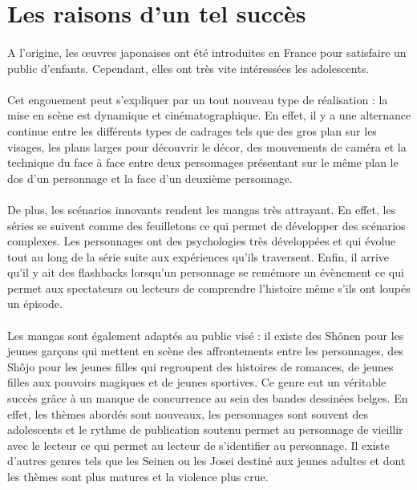 \section{Les raisons d'un tel succès}

\paragraph{} A l’origine, les œuvres japonaises ont été introduites en France
pour satisfaire un public d’enfants. Cependant, elles ont très vite intéressées
les adolescents. 

\paragraph{} Cet engouement peut s’expliquer par un tout nouveau type de
réalisation : la mise en scène est dynamique et cinématographique. En effet, il
y a une alternance continue entre les différents types de cadrages tels que des
gros plan sur les visages, les plans larges pour découvrir le décor, des
mouvements de caméra et la technique du face à face entre deux personnages
présentant sur le même plan le dos d’un personnage et la face d’un deuxième
personnage. 

\paragraph{} De plus, les scénarios innovants rendent les mangas très
attrayant. En effet, les séries se suivent comme des feuilletons ce qui permet
de développer des scénarios complexes. Les personnages ont des psychologies
très développées et qui évolue tout au long de la série suite aux expériences
qu’ils traversent. Enfin, il arrive qu’il y ait des flashbacks lorsqu’un
personnage se remémore un évènement ce qui permet aux spectateurs ou lecteurs
de comprendre l’histoire même s’ils ont loupés un épisode. 

\paragraph{} Les mangas sont également adaptés au public visé : il existe des
Shônen pour les jeunes garçons qui mettent en scène des affrontements entre les
personnages, des Shôjo pour les jeunes filles qui regroupent des histoires de
romances, de jeunes filles aux pouvoirs magiques et de jeunes sportives. Ce
genre eut un véritable succès grâce à un manque de concurrence au sein des
bandes dessinées belges. En effet, les thèmes abordés sont nouveaux, les
personnages sont souvent des adolescents et le rythme de publication soutenu
permet au personnage de vieillir avec le lecteur ce qui permet au lecteur de
s’identifier au personnage. Il existe d’autres genres tels que les Seinen ou
les Josei destiné aux jeunes adultes et dont les thèmes sont plus matures et la
violence plus crue.

